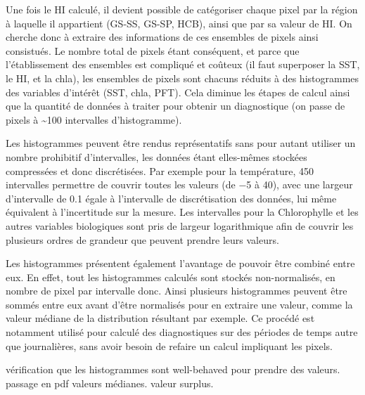 Une fois le HI calculé, il devient possible de catégoriser chaque pixel par la région à laquelle il appartient (GS-SS, GS-SP, HCB), ainsi que par sa valeur de HI.
On cherche donc à extraire des informations de ces ensembles de pixels ainsi consistués.
Le nombre total de pixels étant conséquent, et parce que l'établissement des ensembles est compliqué et coûteux (il faut superposer la SST, le HI, et la \gls{chla}), les ensembles de pixels sont chacuns réduits à des histogrammes des variables d'intérêt (SST, \gls{chla}, PFT).
Cela diminue les étapes de calcul ainsi que la quantité de données à traiter pour obtenir un diagnostique (on passe de  pixels à \num{~100} intervalles d'histogramme).

Les histogrammes peuvent être rendus représentatifs sans pour autant utiliser un nombre prohibitif d'intervalles, les données étant elles-mêmes stockées compressées et donc discrétisées. Par exemple pour la température, 450 intervalles permettre de couvrir toutes les valeurs (de \qty{-5}{\dC} à \qty{40}{\dC}), avec une largeur d'intervalle de \qty{0.1}{\dC} égale à l'intervalle de discrétisation des données, lui même équivalent à l'incertitude sur la mesure.
Les intervalles pour la Chlorophylle et les autres variables biologiques sont pris de largeur logarithmique afin de couvrir les plusieurs ordres de grandeur que peuvent prendre leurs valeurs.

Les histogrammes présentent également l'avantage de pouvoir être combiné entre eux.
En effet, tout les histogrammes calculés sont stockés non-normalisés, en nombre de pixel par intervalle donc. Ainsi plusieurs histogrammes peuvent être sommés entre eux avant d'être normalisés pour en extraire une valeur, comme la valeur médiane de la distribution résultant par exemple.
Ce procédé est notamment utilisé pour calculé des diagnostiques sur des périodes de temps autre que journalières, sans avoir besoin de refaire un calcul impliquant les pixels.

vérification que les histogrammes sont well-behaved pour prendre des valeurs.
passage en pdf
valeurs médianes.
valeur surplus.
